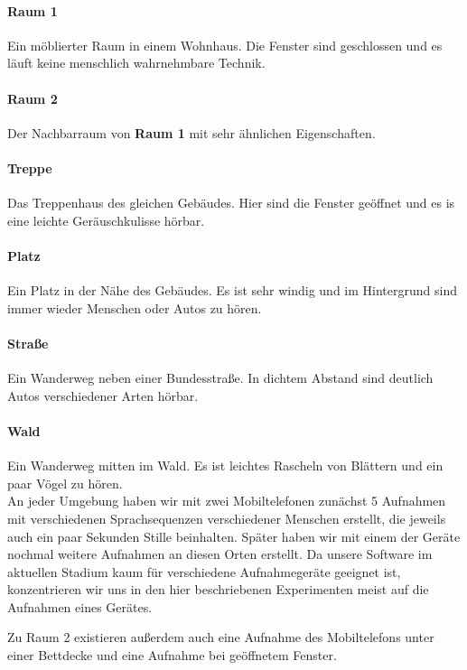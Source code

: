 \documentclass[
	fontsize=10.5pt,
	marginpar=false,
	ngerman,
	accentcolor=3d
	]{tudapub}
\begin{document}
\paragraph{Raum 1} Ein möblierter Raum in einem Wohnhaus. Die Fenster sind geschlossen und es läuft keine menschlich wahrnehmbare Technik.
\paragraph{Raum 2} Der Nachbarraum von \textbf{Raum 1} mit sehr ähnlichen Eigenschaften.
\paragraph{Treppe} Das Treppenhaus des gleichen Gebäudes. Hier sind die Fenster geöffnet und es is eine leichte Geräuschkulisse hörbar.
\paragraph{Platz} Ein Platz in der Nähe des Gebäudes. Es ist sehr windig und im Hintergrund sind immer wieder Menschen oder Autos zu hören.
\paragraph{Straße} Ein Wanderweg neben einer Bundesstraße. In dichtem Abstand sind deutlich Autos verschiedener Arten hörbar.
\paragraph{Wald} Ein Wanderweg mitten im Wald. Es ist leichtes Rascheln von Blättern und ein paar Vögel zu hören.\\

An jeder Umgebung haben wir mit zwei Mobiltelefonen zunächst 5 Aufnahmen mit verschiedenen Sprachsequenzen verschiedener Menschen erstellt, die jeweils auch ein paar Sekunden Stille beinhalten. Später haben wir mit einem der Geräte nochmal weitere Aufnahmen an diesen Orten erstellt. Da unsere Software im aktuellen Stadium kaum für verschiedene Aufnahmegeräte geeignet ist, konzentrieren wir uns in den hier beschriebenen Experimenten meist auf die Aufnahmen eines Gerätes.

Zu Raum 2 existieren außerdem auch eine Aufnahme des Mobiltelefons unter einer Bettdecke und eine Aufnahme bei geöffnetem Fenster.
\end{document}
